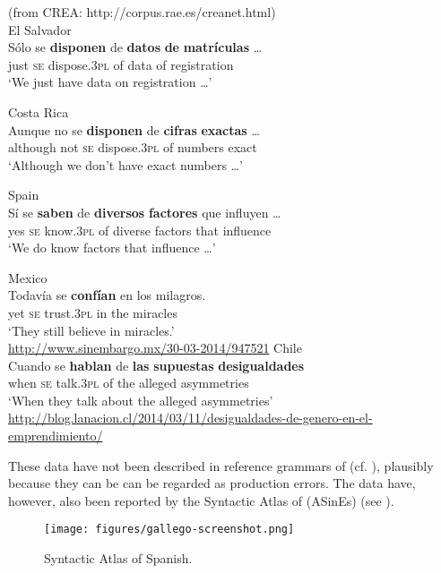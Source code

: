 \documentclass[output=paper]{langsci/langscibook}
\begin{document}
\ea%
    (from CREA: http://corpus.rae.es/creanet.html)\label{ex:gallego:28}\\
    \ea  El Salvador\\
    \gll Sólo se  \textbf{disponen}     de  \textbf{datos} \textbf{de}  \textbf{matrículas} …     \\
         just  \textsc{se}   dispose{}.\textsc{3pl} of  data    of  registration\\
    \glt ‘We just have data on registration …’
    \noindent\parbox{\textwidth}{\ex  Costa Rica\\
    \gll Aunque   no   se \textbf{disponen}      de  \textbf{cifras}       \textbf{exactas} …  \\
         although not \textsc{se}   dispose{}.\textsc{3pl}  of   numbers  exact\\
    \glt ‘Although we don’t have exact numbers …’}
    \ex  Spain\\
    \gll   Sí   se  \textbf{saben}        de \textbf{diversos} \textbf{factores} que influyen …  \\
           yes \textsc{se}   know{}.\textsc{3pl}  of  diverse   factors    that influence\\
    \glt   ‘We do know factors that influence …’
    \z
\z    


\ea%
    \label{ex:gallego:29}
    \ea  Mexico\\
    \gll Todavía se   \textbf{confían}    en  los   milagros.\\
         yet         \textsc{se}   trust{}.\textsc{3pl}  in  the   miracles\\
    \glt ‘They still believe in miracles.’\\
    {\small\url{http://www.sinembargo.mx/30-03-2014/947521}}
    \ex  Chile\\
    \gll Cuando se   \textbf{hablan}    de  \textbf{las} \textbf{supuestas} \textbf{desigualdades} \\
         when     \textsc{se}   talk{}.\textsc{3pl}   of  the alleged      asymmetries\\
    \glt ‘When they talk about the alleged asymmetries’\\
    {\small\url{http://blog.lanacion.cl/2014/03/11/desigualdades-de-genero-en-el-emprendimiento/}}
    \z
\z    

These data have not been described in reference grammars of  (cf. \citealt{Bosque1999,RAE-ASALE2009}), plausibly because they can be can be regarded as production errors. The data have, however, also been reported by the Syntactic Atlas of  (ASinEs) (see ).\largerpage[-1]
\vfill
\begin{figure}[bh]\caption{Syntactic Atlas of Spanish. \citep{GallegoWebsite}\label{ex:gallego:30}}
\texttt{[image: figures/gallego-screenshot.png]}
\end{figure}
\end{document}
